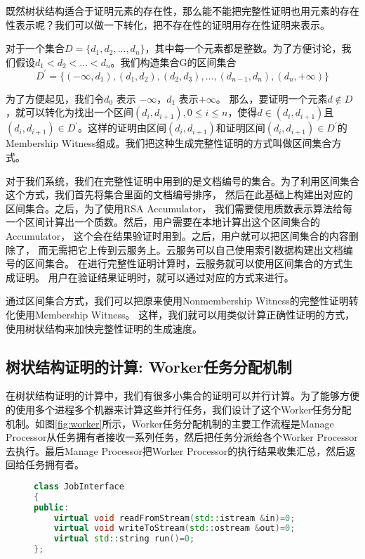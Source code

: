 既然树状结构适合于证明元素的存在性，那么能不能把完整性证明也用元素的存在性表示呢？我们可以做一下转化，把不存在性的证明用存在性证明来表示。

对于一个集合$D = \{d_1, d_2, ..., d_n\}$，其中每一个元素都是整数。为了方便讨论，我们假设$d_1 < d_2 < ... < d_n$。我们构造集合G的区间集合
\begin{equation} D^\prime = \{(-\infty, d_1), (d_1, d_2), (d_2, d_3), ... ,(d_{n-1}, d_n), (d_n, +\infty)\}\end{equation}

为了方便起见，我们令$d_0$ 表示 $-\infty$，$d_1$ 表示$+\infty$。
那么，要证明一个元素$d \notin D$，就可以转化为找出一个区间$(d_i, d_{i+1}), 0 \le i \le n$，使得$d \in (d_i, d_{i+1})$且$(d_i, d_{i+1}) \in D^\prime$。这样的证明由区间$(d_i, d_{i+1})$和证明区间$(d_i, d_{i+1}) \in D^\prime$的Membership Witness组成。我们把这种生成完整性证明的方式叫做区间集合方式。

对于我们系统，我们在完整性证明中用到的是文档编号的集合。为了利用区间集合这个方式，我们首先将集合里面的文档编号排序，
然后在此基础上构建出对应的区间集合。之后，为了使用RSA Accumulator，
我们需要使用质数表示算法给每一个区间计算出一个质数。然后，用户需要在本地计算出这个区间集合的Accumulator，
这个会在结果验证时用到。之后，用户就可以把区间集合的内容删除了，
而无需把它上传到云服务上。云服务可以自己使用索引数据构建出文档编号的区间集合。
在进行完整性证明计算时，云服务就可以使用区间集合的方式生成证明。
用户在验证结果证明时，就可以通过对应的方式来进行。

通过区间集合方式，我们可以把原来使用Nonmembership Witness的完整性证明转化使用Membership Witness。
这样，我们就可以用类似计算正确性证明的方式，使用树状结构来加快完整性证明的生成速度。


\subsection{树状结构证明的计算: Worker任务分配机制}
在树状结构证明的计算中，我们有很多小集合的证明可以并行计算。为了能够方便的使用多个进程多个机器来计算这些并行任务，我们设计了这个Worker任务分配机制。如图\ref{fig:worker}所示，Worker任务分配机制的主要工作流程是Manage Processor从任务拥有者接收一系列任务，然后把任务分派给各个Worker Processor去执行。最后Manage Processor把Worker Processor的执行结果收集汇总，然后返回给任务拥有者。

\begin{figure}[htb]
\begin{lstlisting}[language=C++] 
class JobInterface
{
public:
    virtual void readFromStream(std::istream &in)=0;
    virtual void writeToStream(std::ostream &out)=0;
    virtual std::string run()=0;
};
\end{lstlisting}
\end{figure}


